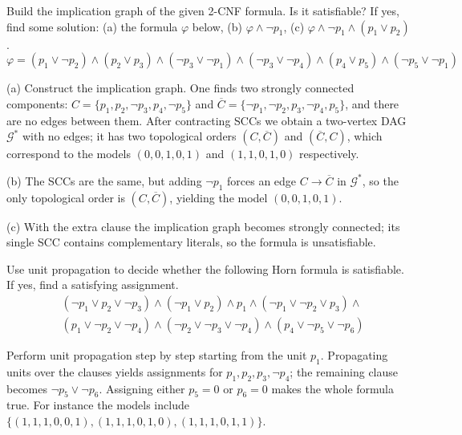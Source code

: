 \begin{problem} \label{problem:2sat}
    
    Build the implication graph of the given 2-CNF formula. Is it satisfiable? If yes, find some solution: (a) the formula $\varphi$ below, (b) $\varphi\land\neg p_1$, (c) $\varphi\land\neg p_1\land(p_1\lor p_2)$.
    $$
    \varphi=(p_1\vee \neg p_2)\wedge (p_2\vee p_3)\wedge (\neg p_3\vee \neg p_1)\wedge (\neg p_3\vee \neg p_4)\wedge (p_4\vee p_5)\wedge (\neg p_5\vee \neg p_1)
    $$

    \begin{solution}
        (a) Construct the implication graph. One finds two strongly connected components: $C=\{p_1,p_2,\neg p_3,p_4,\neg p_5\}$ and $\overline{C}=\{\neg p_1,\neg p_2,p_3,\neg p_4,p_5\}$, and there are no edges between them. After contracting SCCs we obtain a two-vertex DAG $\mathcal G^*$ with no edges; it has two topological orders $(C,\overline{C})$ and $(\overline{C},C)$, which correspond to the models $(0,0,1,0,1)$ and $(1,1,0,1,0)$ respectively.
        
        (b) The SCCs are the same, but adding $\neg p_1$ forces an edge $C\to\overline{C}$ in $\mathcal G^*$, so the only topological order is $(C,\overline{C})$, yielding the model $(0,0,1,0,1)$.

        (c) With the extra clause the implication graph becomes strongly connected; its single SCC contains complementary literals, so the formula is unsatisfiable.
    \end{solution}

\end{problem}


\begin{problem}

    Use unit propagation to decide whether the following Horn formula is satisfiable. If yes, find a satisfying assignment.
    \begin{align*}
        &(\neg p_1 \vee p_2 \vee \neg p_3)\wedge(\neg p_1 \vee p_2)\wedge p_1 \wedge (\neg p_1 \vee \neg p_2 \vee p_3)\wedge \\
        &(p_1\vee\neg p_2 \vee \neg p_4)\wedge(\neg p_2 \vee \neg p_3 \vee \neg p_4)\wedge(p_4\vee \neg p_5 \vee\neg p_6)
    \end{align*}

    \begin{solution}
        Perform unit propagation step by step starting from the unit $p_1$. Propagating units over the clauses yields assignments for $p_1,p_2,p_3,\neg p_4$; the remaining clause becomes $\neg p_5\lor\neg p_6$. Assigning either $p_5=0$ or $p_6=0$ makes the whole formula true. For instance the models include $\{(1,1,1,0,0,1),(1,1,1,0,1,0),(1,1,1,0,1,1)\}$.
    \end{solution}
    
\end{problem}


